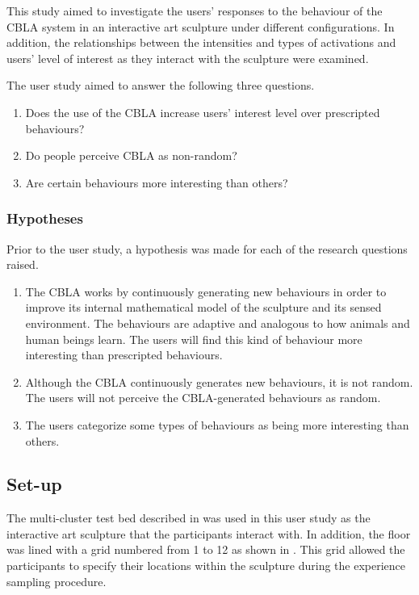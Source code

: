 This study aimed to investigate the users' responses to the behaviour of the CBLA system in an interactive art sculpture under different configurations. In addition, the relationships between the intensities and types of activations and users' level of interest as they interact with the sculpture were examined.

The user study aimed to answer the following three questions.

\begin{enumerate}
	\item Does the use of the CBLA increase users' interest level over prescripted behaviours?\label{itm:research-q1}
	\item Do people perceive CBLA as non-random?\label{itm:research-q2}
	\item Are certain behaviours  more interesting than others?\label{itm:research-q3}
\end{enumerate}


\subsubsection{Hypotheses}

Prior to the user study, a hypothesis was made for each of the research questions raised.

\begin{enumerate}
	\item The CBLA works by continuously generating new behaviours in order to improve its internal mathematical model of the sculpture and its sensed environment. The behaviours are adaptive and analogous to how animals and human beings learn. The users will find this kind of behaviour more interesting than prescripted behaviours.
	\item Although the CBLA continuously generates new behaviours, it is not random. The users will not perceive the CBLA-generated behaviours as random. 
	\item The users categorize some types of behaviours as being more interesting than others. 
\end{enumerate}

\subsection{Set-up}

The multi-cluster test bed described in  was used in this user study as the interactive art sculpture that the participants interact with. In addition, the floor was lined with a grid numbered from 1 to 12 as shown in . This grid allowed the participants to specify their locations within the sculpture during the experience sampling procedure.  

